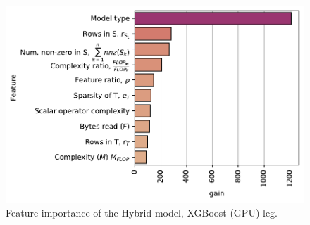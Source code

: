
\begin{figure}
    \centering
    \includegraphics[width=0.75\linewidth]{chapters/05_cost_estimation/figures/xgboost-feat-importance.pdf}
    \caption{Feature importance of the Hybrid model, XGBoost (GPU) leg.}
    \label{fig:5-gpu-feature-importance}
\end{figure}



